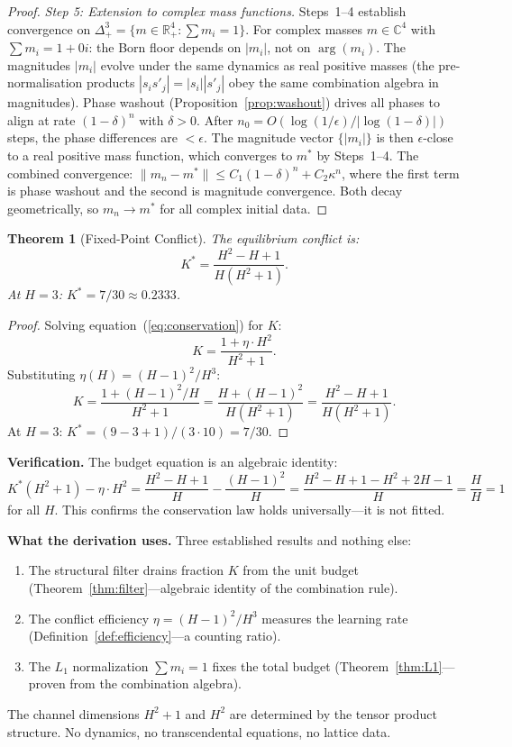 \documentclass[11pt,a4paper]{article}
\newtheorem{theorem}{Theorem}[section]
\theoremstyle{definition}
\theoremstyle{remark}
\newcommand{\C}{\mathbb{C}}
\newcommand{\R}{\mathbb{R}}
\begin{document}
\begin{proof}
\emph{Step 5: Extension to complex mass functions.} Steps~1--4 establish convergence on $\Delta^3_+=\{m\in\R^4_+:\sum m_i=1\}$. For complex masses $m\in\C^4$ with $\sum m_i=1+0i$: the Born floor depends on $|m_i|$, not on $\arg(m_i)$. The magnitudes $|m_i|$ evolve under the same dynamics as real positive masses (the pre-normalisation products $|s_is'_j|=|s_i||s'_j|$ obey the same combination algebra in magnitudes). Phase washout (Proposition~\ref{prop:washout}) drives all phases to align at rate $(1-\delta)^n$ with $\delta>0$. After $n_0=O(\log(1/\epsilon)/|\log(1-\delta)|)$ steps, the phase differences are $<\epsilon$. The magnitude vector $\{|m_i|\}$ is then $\epsilon$-close to a real positive mass function, which converges to $m^*$ by Steps~1--4. The combined convergence: $\|m_n-m^*\|\leq C_1(1-\delta)^n+C_2\kappa^n$, where the first term is phase washout and the second is magnitude convergence. Both decay geometrically, so $m_n\to m^*$ for all complex initial data.
\end{proof}

\begin{theorem}[Fixed-Point Conflict]\label{thm:fixedpoint}
The equilibrium conflict is:
\begin{equation}\label{eq:Kstar}
K^*=\frac{H^2-H+1}{H(H^2+1)}.
\end{equation}
At $H=3$: $K^*=7/30\approx 0.2333$.
\end{theorem}

\begin{proof}
Solving equation~(\ref{eq:conservation}) for $K$:
\[
K=\frac{1+\eta\cdot H^2}{H^2+1}.
\]
Substituting $\eta(H)=(H-1)^2/H^3$:
\[
K=\frac{1+(H-1)^2/H}{H^2+1}=\frac{H+(H-1)^2}{H(H^2+1)}=\frac{H^2-H+1}{H(H^2+1)}.
\]
At $H=3$: $K^*=(9-3+1)/(3\cdot 10)=7/30$.
\end{proof}

\textbf{Verification.} The budget equation is an algebraic identity:
\[
K^*(H^2+1)-\eta\cdot H^2=\frac{H^2-H+1}{H}-\frac{(H-1)^2}{H}=\frac{H^2-H+1-H^2+2H-1}{H}=\frac{H}{H}=1
\]
for all $H$. This confirms the conservation law holds universally---it is not fitted.

\textbf{What the derivation uses.} Three established results and nothing else:
\begin{enumerate}[nosep]
\item The structural filter drains fraction $K$ from the unit budget (Theorem~\ref{thm:filter}---algebraic identity of the combination rule).
\item The conflict efficiency $\eta=(H-1)^2/H^3$ measures the learning rate (Definition~\ref{def:efficiency}---a counting ratio).
\item The $L_1$ normalization $\sum m_i=1$ fixes the total budget (Theorem~\ref{thm:L1}---proven from the combination algebra).
\end{enumerate}
The channel dimensions $H^2+1$ and $H^2$ are determined by the tensor product structure. No dynamics, no transcendental equations, no lattice data.
\end{document}

